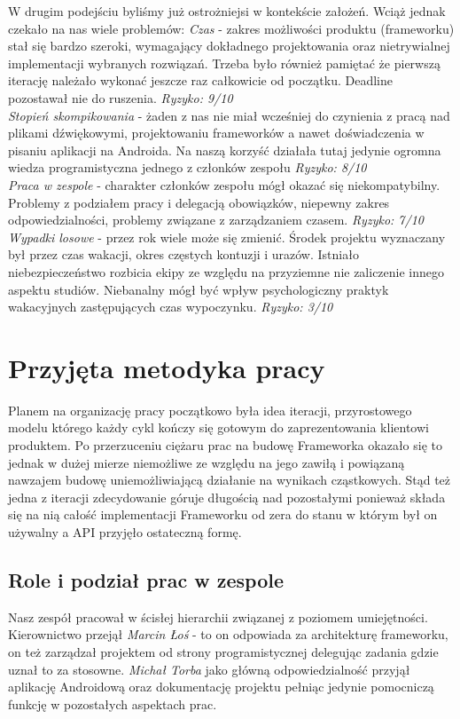 W drugim podejściu byliśmy już ostrożniejsi w kontekście założeń. Wciąż jednak czekało na nas wiele problemów:
\emph{Czas} - zakres możliwości produktu (frameworku) stał się bardzo szeroki, wymagający dokładnego projektowania oraz nietrywialnej implementacji wybranych rozwiązań. Trzeba było również pamiętać że pierwszą iterację należało wykonać jeszcze raz całkowicie od początku. Deadline pozostawał nie do ruszenia. \emph{Ryzyko: 9/10}
\\
\emph{Stopień skompikowania} - żaden z nas nie miał wcześniej do czynienia z pracą nad plikami dźwiękowymi, projektowaniu frameworków a nawet doświadczenia w pisaniu aplikacji na Androida. Na naszą korzyść działała tutaj jedynie ogromna wiedza programistyczna jednego z członków zespołu \emph{Ryzyko: 8/10}
\\
\emph{Praca w zespole} - charakter członków zespołu mógł okazać się niekompatybilny. Problemy z podziałem pracy i delegacją obowiązków, niepewny zakres odpowiedzialności, problemy związane z zarządzaniem czasem. \emph{Ryzyko: 7/10} 
\emph{Wypadki losowe} - przez rok wiele może się zmienić. Środek projektu wyznaczany był przez czas wakacji, okres częstych kontuzji i urazów. Istniało niebezpieczeństwo rozbicia ekipy ze względu na przyziemne nie zaliczenie innego aspektu studiów. Niebanalny mógł być wpływ psychologiczny praktyk wakacyjnych zastępujących czas wypoczynku. \emph{Ryzyko: 3/10} 

\chapter{Przyjęta metodyka pracy}
Planem na organizację pracy początkowo była idea iteracji, przyrostowego modelu którego każdy cykl kończy się gotowym do zaprezentowania klientowi produktem. Po przerzuceniu ciężaru prac na budowę Frameworka okazało się to jednak w dużej mierze niemożliwe ze względu na jego zawiłą i powiązaną nawzajem budowę uniemożliwiającą działanie na wynikach cząstkowych. Stąd też jedna z iteracji zdecydowanie góruje długością nad pozostałymi ponieważ składa się na nią całość implementacji Frameworku od zera do stanu w którym był on używalny a API przyjęło ostateczną formę.
\section{Role i podział prac w zespole}
Nasz zespół pracował w ścisłej hierarchii związanej z poziomem umiejętności. Kierownictwo przejął \emph{Marcin Łoś} - to on odpowiada za architekturę frameworku, on też zarządzał projektem od strony programistycznej delegując zadania gdzie uznał to za stosowne. \emph{Michał Torba} jako główną odpowiedzialność przyjął aplikację Androidową oraz dokumentację projektu pełniąc jedynie pomocniczą funkcję w pozostałych aspektach prac.
